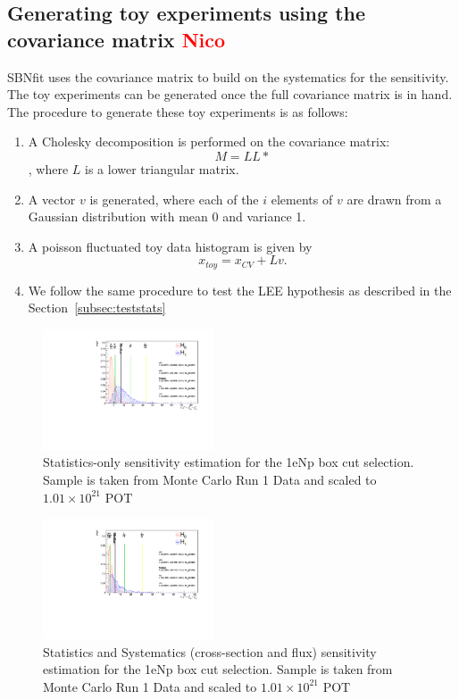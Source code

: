 \documentclass[a4paper]{article}
\begin{document}
\subsection{Generating toy experiments using the covariance matrix \textcolor{red}{Nico}}
SBNfit uses the covariance matrix to build on the systematics for the sensitivity. The toy experiments can be generated once the full covariance matrix is in hand. The procedure to generate these toy experiments is as follows:
\begin{enumerate}
    \item A Cholesky decomposition is performed on the covariance matrix: $$M = LL*$$,
    where $L$ is a lower triangular matrix.
    \item A vector $v$ is generated, where each of the $i$ elements of $v$ are drawn from a Gaussian distribution with mean 0 and variance 1.
    \item A poisson fluctuated toy data histogram is given by
$$x_{toy} = x_{CV} + Lv.$$
    \item We follow the same procedure to test the LEE hypothesis as described in the Section~\ref{subsec:teststats}
\end{enumerate}

\begin{figure}[H]
\begin{center}
\includegraphics[width=0.45\textwidth]{Sensitivity/SBNfit_Cls_nue_reco_e_genietune_run1_LEE_deltachi_statonly.pdf}
\caption{\label{fig:1eNp:box:statonlysensitivity} Statistics-only sensitivity estimation for the 1eNp box cut selection. Sample is taken from Monte Carlo Run 1 Data and scaled to $1.01\times10^{21}$ POT}
\end{center}
\end{figure}

\begin{figure}[H]
\begin{center}
\includegraphics[width=0.45\textwidth]{Sensitivity/SBNfit_Cls_nue_reco_e_genietune_run1_LEE_syst.pdf}
\caption{\label{fig:1eNp:box:statsystsensitivity} Statistics and Systematics (cross-section and flux) sensitivity estimation for the 1eNp box cut selection. Sample is taken from Monte Carlo Run 1 Data and scaled to $1.01\times10^21$ POT}
\end{center}
\end{figure}
\end{document}
